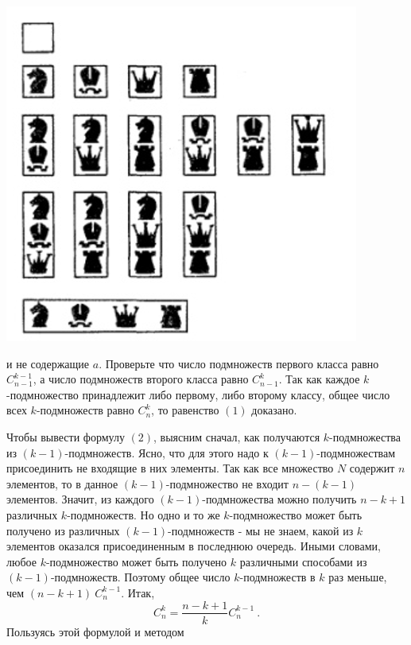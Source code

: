 \documentclass[11pt, a4paper, twocolumn]{report}
\begin{document}
\includegraphics[width=\linewidth]{first.png}

 и не содержащие $a$. Проверьте что число подмножеств первого класса равно $C^{k-1}_{n-1}$, а число подмножеств второго класса равно $C^k_{n-1}$. Так как каждое $k$-подмножество принадлежит либо первому, либо второму классу, общее число всех $k$-подмножеств равно $C^k_n$, то равенство $ (1) $ доказано.

Чтобы вывести формулу $ (2) $, выясним сначал, как получаются $k$-подмножества из $(k-1)$-подмножеств. Ясно, что для этого надо к $(k-1)$-подмножествам присоединить не входящие в них элементы. Так как все множество $N$ содержит $n$ элементов, то в данное $(k-1)$-подмножество не входит $n-(k-1)$ элементов. Значит, из каждого $(k - 1)$-подмножества можно получить $n - k + 1$ различных $k$-подмножеств. Но одно и то же $k$-подмножество может быть получено из различных $(k - 1)$-подмножеств - мы не знаем, какой из $k$ элементов оказался присоединенным в последнюю очередь. Иными словами, любое $k$-подмножество может быть получено $k$ различными способами из $(k - 1)$-подмножеств. Поэтому общее число $k$-подмножеств в $k$ раз меньше, чем $(n - k +1)~ C^{k-1}_n$. Итак,
\[C^k_n = \frac{n-k+1}{k}C^{k-1}_{n}~.\]
Пользуясь этой формулой и методом
\end{document}
